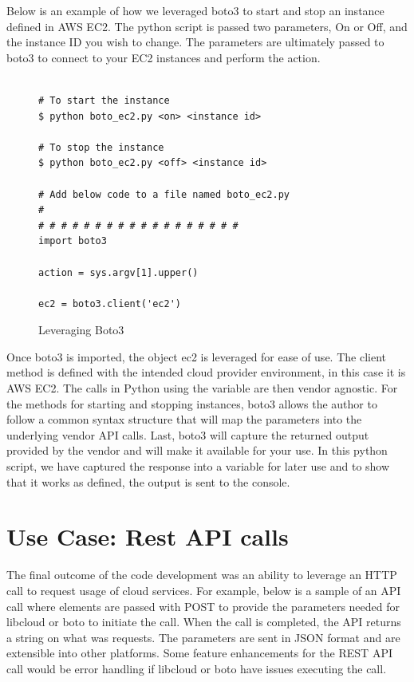Below is an example of how we leveraged boto3 to start and stop an instance
defined in AWS EC2. The python script is passed two parameters, On or Off, and
the instance ID you wish to change. The parameters are ultimately passed to
boto3 to connect to your EC2 instances and perform the action.

\begin{figure}[htb]
\begin{verbatim}

# To start the instance
$ python boto_ec2.py <on> <instance id>

# To stop the instance
$ python boto_ec2.py <off> <instance id>

# Add below code to a file named boto_ec2.py
# 
# # # # # # # # # # # # # # # # # # 
import boto3

action = sys.argv[1].upper()

ec2 = boto3.client('ec2')

\end{verbatim}

\caption{Leveraging Boto3~\cite{hid-sp18-518-Boto3}}\label{c:boto3-example}

\end{figure}

Once boto3 is imported, the object ec2 is leveraged for ease of use. The client
method is defined with the intended cloud provider environment, in this case it
is AWS EC2. The calls in Python using the variable are then vendor agnostic.
For
the methods for starting and stopping instances, boto3 allows the author to
follow a common syntax structure that will map the parameters into the
underlying vendor API calls. Last, boto3 will capture the returned output
provided by the vendor and will make it available for your use. In this python
script, we have captured the response into a variable for later use and to show
that it works as defined, the output is sent to the console.

\section{Use Case: Rest API calls}

The final outcome of the code development was an ability to leverage an HTTP
call to request usage of cloud services. For example, below is a sample of an
API call where elements are passed with POST to provide the parameters needed
for libcloud or boto to initiate the call. When the call is completed, the API
returns a string on what was requests. The parameters are sent in JSON format
and are extensible into other platforms. Some feature enhancements for the REST
API call would be error handling if libcloud or boto have issues executing the
call.  

